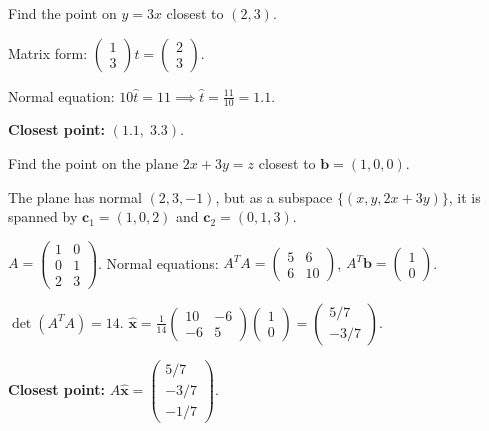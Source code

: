 \begin{example}
Find the point on $y=3x$ closest to $(2,3)$.

Matrix form: $\begin{pmatrix}1\\3\end{pmatrix}t=\begin{pmatrix}2\\3\end{pmatrix}$.

Normal equation: $10\hat{t}=11 \implies \hat{t}=\frac{11}{10}=1.1$.

\textbf{Closest point:} $(1.1,\;3.3)$.
\end{example}

\begin{example}
Find the point on the plane $2x+3y=z$ closest to $\mathbf{b}=(1,0,0)$.

The plane has normal $(2,3,-1)$, but as a subspace $\{(x,y,2x+3y)\}$, it is spanned by $\mathbf{c}_1=(1,0,2)$ and $\mathbf{c}_2=(0,1,3)$.

$A=\begin{pmatrix}1&0\\0&1\\2&3\end{pmatrix}$. Normal equations: $A^TA=\begin{pmatrix}5&6\\6&10\end{pmatrix}$, $A^T\mathbf{b}=\begin{pmatrix}1\\0\end{pmatrix}$.

$\det(A^TA)=14$. $\hat{\mathbf{x}}=\frac{1}{14}\begin{pmatrix}10&-6\\-6&5\end{pmatrix}\begin{pmatrix}1\\0\end{pmatrix}=\begin{pmatrix}5/7\\-3/7\end{pmatrix}$.

\textbf{Closest point:} $A\hat{\mathbf{x}}=\begin{pmatrix}5/7\\-3/7\\-1/7\end{pmatrix}$.
\end{example}

